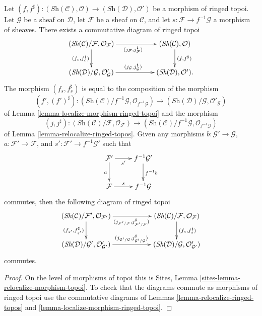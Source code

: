 \begin{lemma}
\label{lemma-relocalize-morphism-ringed-topoi}
Let
$(f, f^\sharp) :
(\textit{Sh}(\mathcal{C}), \mathcal{O})
\to
(\textit{Sh}(\mathcal{D}), \mathcal{O}')$
be a morphism of ringed topoi.
Let $\mathcal{G}$ be a sheaf on $\mathcal{D}$,
let $\mathcal{F}$ be a sheaf on $\mathcal{C}$,
and let $s : \mathcal{F} \to f^{-1}\mathcal{G}$ a morphism of sheaves.
There exists a commutative diagram of ringed topoi
$$
\xymatrix{
(\textit{Sh}(\mathcal{C})/\mathcal{F}, \mathcal{O}_{\mathcal{F}})
\ar[rr]_{(j_{\mathcal{F}}, j_{\mathcal{F}}^\sharp)}
\ar[d]_{(f_c, f_c^\sharp)} & &
(\textit{Sh}(\mathcal{C}), \mathcal{O})
\ar[d]^{(f, f^\sharp)} \\
(\textit{Sh}(\mathcal{D})/\mathcal{G}, \mathcal{O}'_{\mathcal{G}})
\ar[rr]^{(j_{\mathcal{G}}, j_{\mathcal{G}}^\sharp)} & &
(\textit{Sh}(\mathcal{D}), \mathcal{O}').
}
$$
The morphism $(f_s, f_s^\sharp)$
is equal to the composition of the morphism
$$
(f', (f')^\sharp) :
(\textit{Sh}(\mathcal{C})/f^{-1}\mathcal{G}, \mathcal{O}_{f^{-1}\mathcal{G}})
\longrightarrow
(\textit{Sh}(\mathcal{D})/{\mathcal{G}}, \mathcal{O}'_{\mathcal{G}})
$$
of
Lemma \ref{lemma-localize-morphism-ringed-topoi}
and the morphism
$$
(j, j^\sharp) :
(\textit{Sh}(\mathcal{C})/\mathcal{F}, \mathcal{O}_{\mathcal{F}})
\to
(\textit{Sh}(\mathcal{C})/f^{-1}\mathcal{G}, \mathcal{O}_{f^{-1}\mathcal{G}})
$$
of
Lemma \ref{lemma-relocalize-ringed-topos}.
Given any morphisms $b : \mathcal{G}' \to \mathcal{G}$,
$a : \mathcal{F}' \to \mathcal{F}$, and
$s' : \mathcal{F}' \to f^{-1}\mathcal{G}'$ such that
$$
\xymatrix{
\mathcal{F}' \ar[r]_-{s'} \ar[d]_a &
f^{-1}\mathcal{G}' \ar[d]^{f^{-1}b} \\
\mathcal{F} \ar[r]^-s &
f^{-1}\mathcal{G}
}
$$
commutes, then the following diagram of ringed topoi
$$
\xymatrix{
(\textit{Sh}(\mathcal{C})/\mathcal{F}', \mathcal{O}_{\mathcal{F}'})
\ar[rr]_{(j_{\mathcal{F}'/\mathcal{F}}, j_{\mathcal{F}'/\mathcal{F}}^\sharp)}
\ar[d]_{(f_{s'}, f_{s'}^\sharp)} & &
(\textit{Sh}(\mathcal{C})/\mathcal{F}, \mathcal{O}_\mathcal{F})
\ar[d]^{(f_s, f_s^\sharp)} \\
(\textit{Sh}(\mathcal{D})/\mathcal{G}', \mathcal{O}'_{\mathcal{G}'})
\ar[rr]^{(j_{\mathcal{G}'/\mathcal{G}}, j_{\mathcal{G}'/\mathcal{G}}^\sharp)}
& &
(\textit{Sh}(\mathcal{D})/\mathcal{G}, \mathcal{O}'_{\mathcal{G}'})
}
$$
commutes.
\end{lemma}

\begin{proof}
On the level of morphisms of topoi this is
Sites, Lemma \ref{sites-lemma-relocalize-morphism-topoi}.
To check that the diagrams commute as morphisms of ringed topoi use
the commutative diagrams of
Lemmas \ref{lemma-relocalize-ringed-topos} and
\ref{lemma-localize-morphism-ringed-topoi}.
\end{proof}

